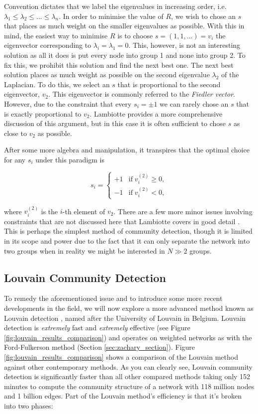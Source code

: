 Convention dictates that we label the eigenvalues in increasing order, i.e. $\lambda_1 \leq \lambda_2 \leq \dots \leq \lambda_n$. In order to minimise the value of $R$, we wish to chose an $s$ that places as much weight on the smaller eigenvalues as possible. With this in mind, the easiest way to minimise $R$ is to choose $s = (1, 1, \dots) = v_i$ the eigenvector corresponding to $\lambda_i = \lambda_1 = 0$. This, however, is not an interesting solution as all it does is put every node into group 1 and none into group 2. To fix this, we prohibit this solution and find the next best one. The next best solution places as much weight as possible on the second eigenvalue $\lambda_2$ of the Laplacian. To do this, we select an $s$ that is proportional to the second eigenvector, $v_2$. This eigenvector is commonly referred to the \emph{Fiedler vector}. However, due to the constraint that every $s_i = \pm 1$ we can rarely chose an $s$ that is exactly proportional to $v_2$. Lambiotte provides a more comprehensive discussion of this argument, but in this case it is often sufficient to chose $s$ as close to $v_2$ as possible.

\newpage

\noindent
After some more algebra and manipulation, it transpires that the optimal choice for any $s_i$ under this paradigm is 

$$ s_i = \begin{cases}
    +1 & \text{if} \; v_i^{(2)} \geq 0, \\
    -1 & \text{if} \; v_i^{(2)} < 0,
\end{cases} $$

where $v_i^{(2)}$ is the $i$-th element of $v_2$. There are a few more minor issues involving constraints that are not discussed here that Lambiotte covers in good detail \cite[27]{oxford:renaud_notes}. This is perhaps the simplest method of community detection, though it is limited in its scope and power due to the fact that it can only separate the network into two groups when in reality we might be interested in $N \gg 2$ groups.

\subsection{Louvain Community Detection}
To remedy the aforementioned issue and to introduce some more recent developments in the field, we will now explore a more advanced method known as Louvain detection \cite{Blondel_2008}, named after the University of Louvain in Belgium. Louvain detection is \emph{extremely} fast and \emph{extremely} effective (see Figure \ref{fig:louvain_results_comparison}) and operates on weighted networks as with the Ford-Fulkerson method (Section \ref{sec:zachary_section}). Figure \ref{fig:louvain_results_comparison} shows a comparison of the Louvain method against other contemporary methods. As you can clearly see, Louvain community detection is significantly faster than all other compared methods taking only 152 minutes to compute the community structure of a network with 118 million nodes and 1 billion edges. Part of the Louvain method's efficiency is that it's broken into two phases:

